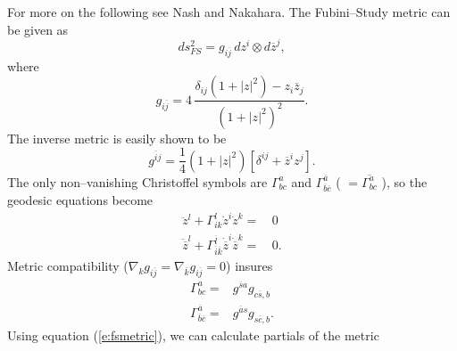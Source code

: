 For more on the following see Nash\cite{Nash:?} and Nakahara\cite{Nakahara:90}.
The Fubini--Study metric can be given as
\begin{equation}
ds_{FS}^2 = g_{i\overline{j}}\, dz^i\otimes d\overline{z}^j,
\end{equation}
where 
\begin{equation}
g_{i\overline{j}} = 4\,\frac{\delta_{ij}\left( 1 + \left| z \right|^2 \right) - z_i\overline{z}_j }
{ \left( 1 + \left| z\right|^2 \right)^2 }.
\label{e:fsmetric}
\end{equation}
The inverse metric is easily shown to be
\begin{equation}
g^{\overline{i}j} = \frac{1}{4}\left( 
                    1+\left| z\right|^2 
                \right) \left[
                    \delta^{ij} + \overline{z}^iz^j
                \right].
\label{e:fsinvmetric}
\end{equation}
The only non--vanishing Christoffel symbols are $\Gamma^a_{bc}$ and
$\Gamma^{\overline{a}}_{\overline{b}\overline{c}}$ ( $=\overline{\Gamma^a_{bc}}$ ), 
so the geodesic equations become
\begin{equation}
\begin{split}
    \ddot{z}^l + \Gamma^l_{ik}\dot{z}^i\dot{z}^k =&\, 0\\
    \ddot{\overline{z}}^l + \Gamma^{\overline{l}}_{\overline{i}\overline{k}}
            \dot{\overline{z}}^i\dot{\overline{z}}^k =&\, 0.
\end{split}
\label{e:geodesics}
\end{equation}
Metric compatibility ($\nabla_kg_{i\overline{j}} = \nabla_{\overline{k}}
g_{i\overline{j}} = 0$) insures
\begin{equation}
\begin{split}
    \Gamma^a_{bc} =& g^{\overline{s}a} g_{c\overline{s},b}\\
    \Gamma^{\overline{a}}_{\overline{b}\overline{c}} =& g^{\overline{a}s} 
                            g_{s\overline{c},b}.
\end{split}
\label{e:xsymb}
\end{equation}
Using equation (\ref{e:fsmetric}), we can calculate partials of the metric 
